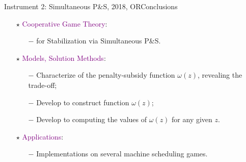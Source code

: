 \documentclass[14pt]{beamer}
\begin{document}
\begin{frame}{Instrument 2: Simultaneous P\&S, {\footnotesize 2018, OR}}{Conclusions}
\centering
\begin{itemize}
\normalsize
\justifying
\item[$\star$] \textcolor{purple}{Cooperative Game Theory}:
\begin{itemize}
\small
\vspace{2mm}
\item[$-$] {\color{blue}{New Instrument}} for Stabilization via Simultaneous P\&S.
\vspace{2mm}
\end{itemize}
\item[$\star$] \textcolor{purple}{Models, Solution Methods}:
\begin{itemize}
\small
\vspace{2mm}
\item[$-$] Characterize {\color{blue}{properties}} of the penalty-subsidy function $\omega(z)$, revealing the trade-off;
\vspace{2mm}
\item[$-$] Develop {\color{blue}{two algorithms}} to construct function $\omega(z)$;
\vspace{2mm}
\item[$-$] Develop {\color{blue}{two solution approaches}} to computing the values of $\omega(z)$ for any given $z$.
\vspace{2mm}
\end{itemize}
\item[$\star$] \textcolor{purple}{Applications}:
\begin{itemize}
\small
\vspace{2mm}
	\item[$-$] Implementations on several machine scheduling games.
\end{itemize}
\end{itemize}
\end{frame}
\end{document}
